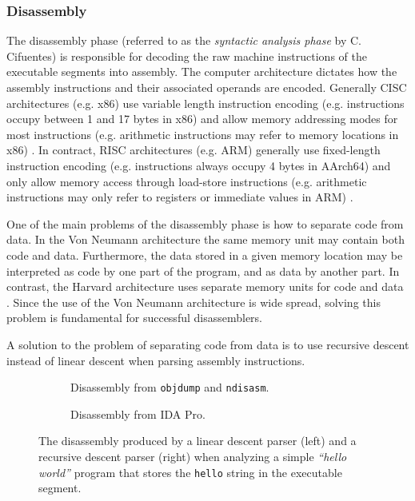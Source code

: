 
\subsubsection{Disassembly}

The disassembly phase (referred to as the \textit{syntactic analysis phase} by C. Cifuentes) is responsible for decoding the raw machine instructions of the executable segments into assembly. The computer architecture dictates how the assembly instructions and their associated operands are encoded. Generally CISC architectures (e.g. x86) use variable length instruction encoding (e.g. instructions occupy between 1 and 17 bytes in x86) and allow memory addressing modes for most instructions (e.g. arithmetic instructions may refer to memory locations in x86) \cite{x86_manual}. In contract, RISC architectures (e.g. ARM) generally use fixed-length instruction encoding (e.g. instructions always occupy 4 bytes in AArch64) and only allow memory access through load-store instructions (e.g. arithmetic instructions may only refer to registers or immediate values in ARM) \cite{arm_manual}.

One of the main problems of the disassembly phase is how to separate code from data. In the Von Neumann architecture the same memory unit may contain both code and data. Furthermore, the data stored in a given memory location may be interpreted as code by one part of the program, and as data by another part. In contrast, the Harvard architecture uses separate memory units for code and data \cite{von_neumann_vs_harvard}. Since the use of the Von Neumann architecture is wide spread, solving this problem is fundamental for successful disassemblers.


A solution to the problem of separating code from data is to use recursive descent instead of linear descent when parsing assembly instructions.


\begin{figure}[htbp]
	\centering
	\begin{subfigure}[t]{0.49\textwidth}
		
		\caption{Disassembly from \texttt{objdump} and \texttt{ndisasm}\protect\footnotemark.}
	\end{subfigure}
	\qquad
	\begin{subfigure}[t]{0.35\textwidth}
		
		\caption{Disassembly from IDA Pro.}
	\end{subfigure}
	\caption{The disassembly produced by a linear descent parser (left) and a recursive descent parser (right) when analyzing a simple \textit{``hello world''} program that stores the \texttt{hello} string in the executable segment.}
\end{figure}

